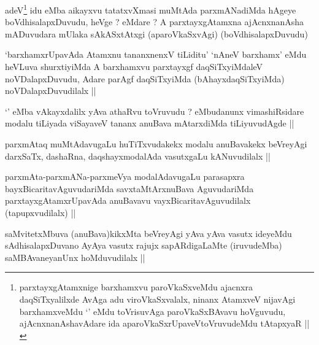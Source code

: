 \begin{artha}
adeV\footnote[1]{parxtayxgAtamxnige barxhamxvu paroVkaSxveMdu ajacnxra
  daqSiTxyalilxde AvAga adu viroVkaSxvalalx, ninanx AtamxveV nijavAgi
  barxhamxveMdu `\stext' eMdu toVrisuvAga paroVkaSxBAvavu hoVguvudu,
  ajAcnxnanAshavAdare ida aparoVkaSxrUpaveVtoVruvudeMdu tAtapxyaR ||} idu eMba aikayxvu tatatxvXmasi muMtAda parxmANadiMda
hAgeye boVdhisalapxDuvudu, heVge ? eMdare ? A parxtayxgAtamxna
ajAcnxnanAsha mADuvudara mUlaka sAkASxtAtxgi (aparoVkaSxvAgi)
(boVdhisalapxDuvudu)
\end{artha}


\begin{artha}
`barxhamxrUpavAda Atamxnu tananxnenxV tiLiditu' `nAneV barxhamx' eMdu
  heVLuva shurxtiyiMda A barxhamxvu parxtayxgf daqSiTxyiMdaleV
  noVDalapxDuvudu, Adare parAgf daqSiTxyiMda (bAhayxdaqSiTxyiMda)
  noVDalapxDuvudilalx ||
\end{artha}


\begin{artha}
`\stext' eMba vAkayxdalilx yAva athaRvu toVruvudu ? eMbudanunx
  vimashiRsidare modalu tiLiyada viSayaveV tananx anuBava mAtarxdiMda
  tiLiyuvudAgde ||
\end{artha}

\begin{artha}
parxmAtaq muMtAdavugaLu huTiTxvudakekx modalu anuBavakekx beVreyAgi
darxSaTx, dashaRna, daqshayxmodalAda vasutxgaLu kANuvudilalx ||
\end{artha}

\begin{artha}
parxmAta-parxmANa-parxmeVya modalAdavugaLu parasapxra
bayxBicaritavAguvudariMda savxtaMtArxnuBava AguvudariMda
parxtayxgAtamxrUpavAda anuBavavu vayxBicaritavAguvudilalx
(tapupxvudilalx) ||
\end{artha}

\begin{artha}
saMvitetxMbuva (anuBava)kikxMta beVreyAgi yAva yAva vasutx ideyeMdu
sAdhisalapxDuvano AyAya vasutx rajujx sapARdigaLaMte (iruvudeMba)
saMBAvaneyanUnx hoMduvudilalx ||
\end{artha}

